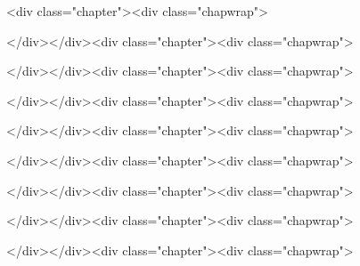\documentclass[11pt,a4paper,oneside]{book}
\begin{document}
{\setcounter{page}{1}
\hypersetup{linkcolor=black}

\ifdefined\HCode
\begin{html}
<div class="chapter"><div class="chapwrap">
\end{html}
\fi

\tableofcontents

\ifdefined\HCode
\begin{html}
</div></div><div class="chapter"><div class="chapwrap">
\end{html}
\fi

\listoffigures
\newpage{}
\hypersetup{linkcolor=LinkGray}
\setcounter{page}{1}

\ifdefined\HCode
\begin{html}
</div></div><div class="chapter"><div class="chapwrap">
\end{html}
\fi



\ifdefined\HCode
\begin{html}
</div></div><div class="chapter"><div class="chapwrap">
\end{html}
\fi



\ifdefined\HCode
\begin{html}
</div></div><div class="chapter"><div class="chapwrap">
\end{html}
\fi



\ifdefined\HCode
\begin{html}
</div></div><div class="chapter"><div class="chapwrap">
\end{html}
\fi



\ifdefined\HCode
\begin{html}
</div></div><div class="chapter"><div class="chapwrap">
\end{html}
\fi



\ifdefined\HCode
\begin{html}
</div></div><div class="chapter"><div class="chapwrap">
\end{html}
\fi



\ifdefined\HCode
\begin{html}
</div></div><div class="chapter"><div class="chapwrap">
\end{html}
\fi

}
\end{document}
